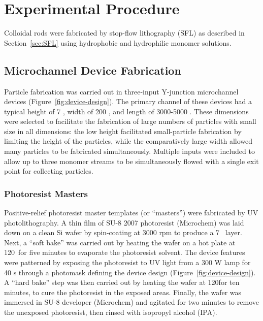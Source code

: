 \section{Experimental Procedure}
\label{sec:rods-exp}

Colloidal rods were fabricated by stop-flow lithography (SFL) as described in Section~\ref{sec:SFL} using
hydrophobic and hydrophilic monomer solutions.  

\subsection{Microchannel Device Fabrication}

Particle fabrication was carried out in 
three-input Y-junction microchannel devices (Figure~\ref{fig:device-design}).
The primary channel of these devices had a typical 
height of 7 \microns, width of 200 \microns, and length of 3000-5000 \microns. These dimensions were selected
to facilitate the fabrication of large numbers of particles with small size in all dimensions: the low height
facilitated small-particle fabrication by limiting the height of the particles, while the comparatively large
width allowed many particles to be fabricated simultaneously. Multiple inputs were included to allow up to three
monomer streams to be simultaneously flowed with a single exit point for collecting particles.

\subsubsection{Photoresist Masters}


Positive-relief photoresist master templates (or ``masters'') were fabricated by UV photolithography. A thin film
of SU-8 2007 photoresist (Microchem) was laid down on a clean Si wafer by spin-coating at 3000 rpm to produce a 
7 \microns~layer. Next, a ``soft bake'' was carried out by heating the wafer on a hot plate at 
120\degC~for five minutes to evaporate the photoresist solvent.  The device features were patterned by exposing the 
photoresist to UV light from a 300 W lamp for 40 s through a photomask defining the device design 
(Figure~\ref{fig:device-design}). A ``hard bake'' step
was then carried out by heating the wafer at 120\degC for ten minutes, to cure the photoresist in the exposed areas.
Finally, the wafer was immersed in SU-8 developer (Microchem) and agitated for two minutes to remove the unexposed
photoresist, then rinsed with isopropyl alcohol (IPA).

